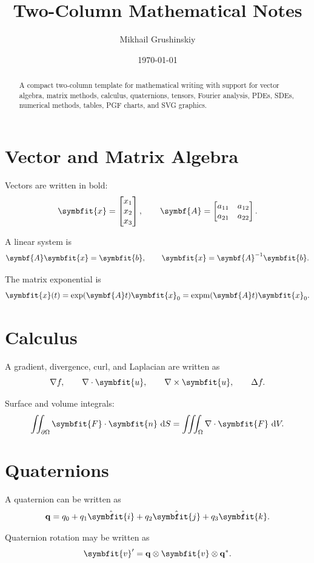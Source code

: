 \documentclass[11pt,twocolumn]{article}
\title{Two-Column Mathematical Notes}
\author{Mikhail Grushinskiy}
\date{\today}
\newcommand{\vct}[1]{\symbfit{#1}}   %
\newcommand{\mat}[1]{\symbf{#1}}     %
\newcommand{\ihat}{\hat{\vct{i}}}
\newcommand{\jhat}{\hat{\vct{j}}}
\newcommand{\khat}{\hat{\vct{k}}}
\newcommand{\inv}{^{-1}}
\newcommand{\dd}{\,\mathrm{d}}
\newcommand{\grad}{\nabla}
\newcommand{\divg}{\nabla \cdot}
\newcommand{\curlop}{\nabla \times}
\newcommand{\laplace}{\Delta}
\newcommand{\expm}{\operatorname{expm}}
\newcommand{\quat}[1]{\mathbf{#1}}
\newcommand{\qconj}[1]{#1^{*}}
\newcommand{\qmul}{\otimes}
\begin{document}
\maketitle

\begin{abstract}
A compact two-column template for mathematical writing with support for
vector algebra, matrix methods, calculus, quaternions, tensors, Fourier
analysis, PDEs, SDEs, numerical methods, tables, PGF charts, and SVG graphics.
\end{abstract}

\section{Vector and Matrix Algebra}

Vectors are written in bold:
\[
\vct{x} =
\begin{bmatrix}
x_1 \\ x_2 \\ x_3
\end{bmatrix},
\qquad
\mat{A} =
\begin{bmatrix}
a_{11} & a_{12} \\
a_{21} & a_{22}
\end{bmatrix}.
\]

A linear system is
\[
\mat{A}\vct{x} = \vct{b},
\qquad
\vct{x} = \mat{A}\inv \vct{b}.
\]

The matrix exponential is
\[
\vct{x}(t) = \exp(\mat{A}t)\vct{x}_0
           = \expm(\mat{A}t)\vct{x}_0.
\]

\section{Calculus}

A gradient, divergence, curl, and Laplacian are written as
\[
\grad f,
\qquad
\divg \vct{u},
\qquad
\curlop \vct{u},
\qquad
\laplace f.
\]

Surface and volume integrals:
\[
\iint_{\partial \Omega} \vct{F} \cdot \vct{n}\,\dd S
=
\iiint_{\Omega} \divg \vct{F}\,\dd V.
\]

\section{Quaternions}

A quaternion can be written as
\[
\quat{q}
=
q_0 + q_1\ihat + q_2\jhat + q_3\khat.
\]

Quaternion rotation may be written as
\[
\vct{v}' = \quat{q} \qmul \vct{v} \qmul \qconj{\quat{q}}.
\]
\end{document}
